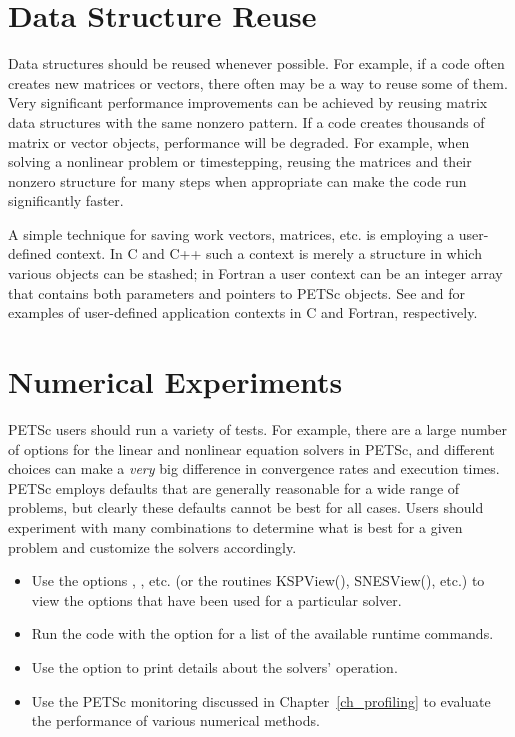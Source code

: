 {{\section{Data Structure Reuse}
\label{sec_dsreuse}

Data structures should be reused whenever possible.  For example, if a code often
creates new matrices or vectors, there often may be a way to reuse some
of them.  Very significant performance improvements can be achieved by
reusing matrix data structures with the same nonzero pattern.  If a code
creates thousands of matrix or vector objects, performance will be
degraded.  For example, when solving a nonlinear problem or timestepping,
reusing the matrices and their nonzero structure for many steps when
 appropriate can make the code run significantly faster.  

A simple technique for saving work vectors, matrices, etc. is employing
a user-defined context.  In C and C++ such a context is merely a
structure in which various objects can be stashed; in Fortran a user
context can be an integer array that contains both parameters and pointers
to PETSc objects. See  and 
 for examples of user-defined application
contexts in C and Fortran, respectively.

\section{Numerical Experiments}

PETSc users should run a variety of tests.  For example, there are a large number of options 
for the linear and nonlinear equation solvers in PETSc, and different 
choices can make a {\em very} big difference in convergence rates and execution 
times.  PETSc employs defaults that are generally reasonable for a wide
range of problems, but clearly these defaults cannot be best for all
cases.  Users should experiment with many combinations to determine 
what is best for a given problem and customize the solvers accordingly.
\begin{itemize}
\item Use the options , , etc. (or the routines 
     KSPView(), SNESView(), etc.) to view the options that have been
     used for a particular solver.
\item Run the code with the option  for a list of the available 
     runtime commands.
\item Use the option  to print details about the solvers' operation.
\item Use the PETSc monitoring discussed in Chapter~\ref{ch_profiling}
     to evaluate the performance of various numerical methods.
\end{itemize}

}}

